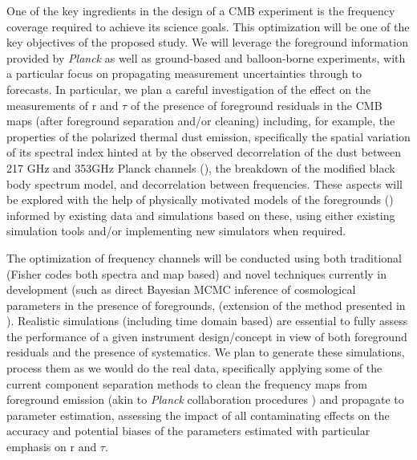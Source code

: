 One of the key ingredients in the design of a CMB experiment is the
frequency coverage required to achieve its science goals. This
optimization will be one of the key objectives of the proposed
study. We will leverage the foreground information provided by
\emph{Planck} as well as ground-based and balloon-borne experiments,
with a particular focus on propagating measurement uncertainties
through to forecasts.
In particular, we plan a
careful investigation of the effect on the measurements of r and
$\tau$ of the presence of foreground residuals in the CMB maps (after
foreground separation and/or cleaning) including, for example, the
properties of the polarized thermal dust emission, specifically the
spatial variation of its spectral index hinted at by the observed
decorrelation of the dust between 217 GHz and 353GHz Planck channels
(\cite{Planck2015-X,Planck2015-L,Planck2015-XXIX,Boulanger2016}), the
breakdown of the modified black body spectrum model, and decorrelation
between frequencies.  These aspects will be explored with the help of
physically motivated models of the foregrounds
(\cite{Bruce+Fraisse2009,Hensley et al in preparation}) informed by
existing data and simulations based on these, using either existing
simulation tools and/or implementing new simulators when required.

The optimization of frequency channels will be conducted using both traditional (Fisher codes both spectra and map based) and novel techniques currently in development (such as direct Bayesian MCMC inference of cosmological parameters in the presence of foregrounds, (extension of the method presented in \cite{Jewell2016}). Realistic simulations (including time domain based) are essential to fully assess the performance of a given instrument design/concept in view of both foreground residuals and the presence of systematics. We plan to generate these simulations, process them as we would do the real data, specifically applying some of the current component separation methods to clean the frequency maps from foreground emission (akin to {\it Planck} collaboration procedures \cite{Planck2015-IX}) and propagate to parameter estimation, assessing the impact of all contaminating effects on the accuracy and potential biases of the parameters estimated with particular emphasis on r and $\tau$.






